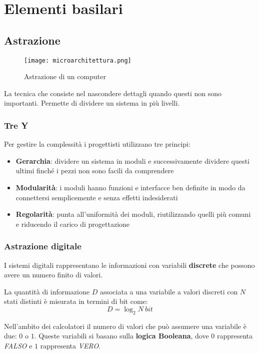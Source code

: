 \newpage
\section{Elementi basilari}
\subsection{Astrazione}
\begin{wrapfigure}{r}{0.25\textwidth}
	\texttt{[image: microarchitettura.png]}
	\caption{Astrazione di un computer}
\end{wrapfigure}
\begin{definition}[Astrazione]
	La tecnica che consiste nel nascondere dettagli quando questi non sono importanti. Permette di dividere un sistema in più livelli.
\end{definition}

\subsubsection{Tre Y}
Per gestire la complessità i progettisti utilizzano tre principi:
\begin{itemize}
	\item \textbf{Gerarchia}: dividere un sistema in moduli e successivamente dividere questi ultimi finché i pezzi non sono facili da comprendere
	\item \textbf{Modularità}: i moduli hanno funzioni e interfacce ben definite in modo da connettersi semplicemente e senza effetti indesiderati
	\item \textbf{Regolarità}: punta all'uniformità dei moduli, riutilizzando quelli più comuni e riducendo il carico di progettazione
\end{itemize}

\subsubsection{Astrazione digitale}
I sistemi digitali rappresentano le informazioni con variabili \textbf{discrete} che possono avere un numero finito di valori.
\begin{definition}
	La quantità di informazione $D$ associata a una variabile a valori discreti con $N$ stati distinti è misurata in termini di bit come:
	\begin{equation}
		D = \log_2 N \: bit
	\end{equation}
\end{definition}
Nell'ambito dei calcolatori il numero di valori che può assumere una variabile è due: $0$ o $1$. Queste variabili si basano sulla \textbf{logica Booleana}, dove $0$ rappresenta \textit{FALSO} e $1$ rappresenta \textit{VERO}.


